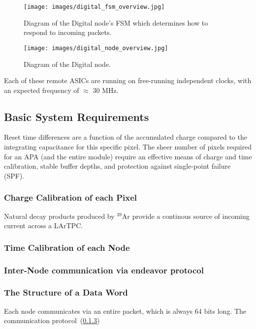 \begin{figure}[]
\centering
\texttt{[image: images/digital\_fsm\_overview.jpg]}
\caption{Diagram of the Digital node's FSM which determines how to respond to incoming packets.}
\end{figure}


\begin{figure}[]
\centering
\texttt{[image: images/digital\_node\_overview.jpg]}
\caption{Diagram of the Digital node.}
\end{figure}

Each of these remote ASICs are running on free-running independent clocks, with an expected frequency of $\approx$ 30 MHz.

\subsection{Basic System Requirements}

Reset time differences are a function of the accumulated charge compared to the integrating capacitance for this specific pixel.
The sheer number of pixels required for an APA (and the entire module) require an effective means of charge and time calibration, stable buffer depths, and protection against single-point failure (SPF). 

\subsubsection{Charge Calibration of each Pixel}

Natural decay products produced by $^39$Ar provide a continous source of incoming current across a LArTPC.


\subsubsection{Time Calibration of each Node}

\subsubsection{Inter-Node communication via endeavor protocol}
\label{sect:endeavor}


\subsubsection{The Structure of a Data Word}

Each node communicates via an entire packet, which is always 64 bits long. 
The communication protocol~(\ref{sect:endeavor})

